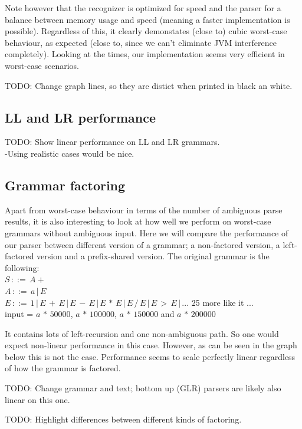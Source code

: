 \documentclass[a4paper,10pt]{article}
\begin{document}
Note however that the recognizer is optimized for speed and the parser for a balance between memory usage and speed (meaning a faster implementation is possible). Regardless of this, it clearly demonstates (close to) cubic worst-case behaviour, as expected (close to, since we can't eliminate JVM interference completely). Looking at the times, our implementation seems very efficient in worst-case scenarios.

TODO: Change graph lines, so they are distict when printed in black an white.

\subsection{LL and LR performance}

TODO: Show linear performance on LL and LR grammars.\\
-Using realistic cases would be nice.

\subsection{Grammar factoring}

Apart from worst-case behaviour in terms of the number of ambiguous parse results, it is also interesting to look at how well we perform on worst-case grammars without ambiguous input. Here we will compare the performance of our parser between different version of a grammar; a non-factored version, a left-factored version and a prefix-shared version. The original grammar is the following:\\
$S\,::=\,A+$\\
$A\,::=\,a\,|\,E$\\
$E\,::=\,1\,|\,E\,+\,E\,|\,E\,-\,E\,|\,E\,*\,E\,|\,E\,/\,E\,|\,E\,>\,E\,|\,...$ 25 more like it ...\\
input = $a\,*\,50000$, $a\,*\,100000$, $a\,*\,150000$ and $a\,*\,200000$

It contains lots of left-recursion and one non-ambiguous path. So one would expect non-linear performance in this case. However, as can be seen in the graph below this is not the case. Performance seems to scale perfectly linear regardless of how the grammar is factored.

TODO: Change grammar and text; bottom up (GLR) parsers are likely also linear on this one.

TODO: Highlight differences between different kinds of factoring.
\end{document}
